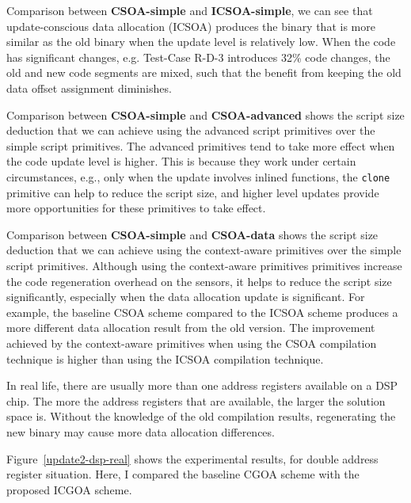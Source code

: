 Comparison between \textbf{CSOA-simple} and \textbf{ICSOA-simple}, we can see that update-conscious data allocation 
(ICSOA) produces the binary that is more similar as the old binary when the update level is relatively low. When the 
code has significant changes, e.g. Test-Case R-D-3 introduces 32\% code changes, the old and new code segments are 
mixed, such that the benefit from keeping the old data offset assignment diminishes.

Comparison between \textbf{CSOA-simple} and \textbf{CSOA-advanced} shows the script size deduction that we can achieve 
using the advanced script primitives over the simple script primitives. The advanced primitives tend to take more 
effect when the code update level is higher. This is because they work under certain circumstances, e.g., only when the 
update involves inlined functions, the {\tt clone} primitive can help to reduce the script size, and higher level 
updates provide more opportunities for these primitives to take effect.

Comparison between \textbf{CSOA-simple} and \textbf{CSOA-data} shows the script size deduction that we can achieve 
using the   context-aware primitives over the simple script primitives. Although using the  context-aware primitives 
primitives increase the code regeneration overhead on the sensors, it helps to reduce the script size significantly, 
especially when the data allocation update is significant. For example, the baseline CSOA scheme compared to the ICSOA 
scheme produces a more different data allocation result from the old version.
The improvement achieved by the  context-aware primitives when using the CSOA compilation technique is higher than 
using the ICSOA compilation technique.

In real life, there are usually more than one address registers available on a DSP chip. The more the address registers 
that are available, the larger the solution space is. Without the knowledge of the old compilation results, 
regenerating the new binary may cause more data allocation differences. 

Figure~\ref{update2-dsp-real} shows the experimental results, for double address register situation.
Here, I compared the baseline CGOA scheme with the proposed ICGOA scheme. 

